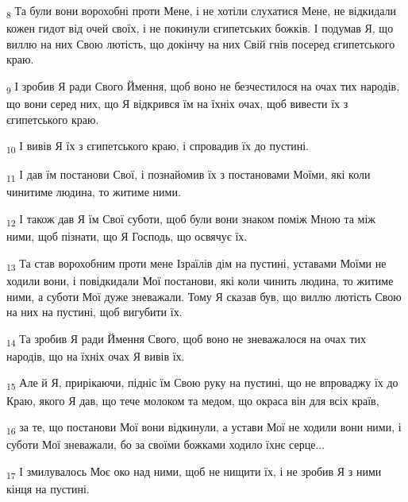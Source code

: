 \begin{tcolorbox}
\textsubscript{8} Та були вони ворохобні проти Мене, і не хотіли слухатися Мене, не відкидали кожен гидот від очей своїх, і не покинули єгипетських божків. І подумав Я, що виллю на них Свою лютість, що докінчу на них Свій гнів посеред єгипетського краю.
\end{tcolorbox}
\begin{tcolorbox}
\textsubscript{9} І зробив Я ради Свого Ймення, щоб воно не безчестилося на очах тих народів, що вони серед них, що Я відкрився їм на їхніх очах, щоб вивести їх з єгипетського краю.
\end{tcolorbox}
\begin{tcolorbox}
\textsubscript{10} І вивів Я їх з єгипетського краю, і спровадив їх до пустині.
\end{tcolorbox}
\begin{tcolorbox}
\textsubscript{11} І дав їм постанови Свої, і познайомив їх з постановами Моїми, які коли чинитиме людина, то житиме ними.
\end{tcolorbox}
\begin{tcolorbox}
\textsubscript{12} І також дав Я їм Свої суботи, щоб були вони знаком поміж Мною та між ними, щоб пізнати, що Я Господь, що освячує їх.
\end{tcolorbox}
\begin{tcolorbox}
\textsubscript{13} Та став ворохобним проти мене Ізраїлів дім на пустині, уставами Моїми не ходили вони, і повідкидали Мої постанови, які коли чинить людина, то житиме ними, а суботи Мої дуже зневажали. Тому Я сказав був, що виллю лютість Свою на них на пустині, щоб вигубити їх.
\end{tcolorbox}
\begin{tcolorbox}
\textsubscript{14} Та зробив Я ради Ймення Свого, щоб воно не зневажалося на очах тих народів, що на їхніх очах Я вивів їх.
\end{tcolorbox}
\begin{tcolorbox}
\textsubscript{15} Але й Я, прирікаючи, підніс їм Свою руку на пустині, що не впроваджу їх до Краю, якого Я дав, що тече молоком та медом, що окраса він для всіх країв,
\end{tcolorbox}
\begin{tcolorbox}
\textsubscript{16} за те, що постанови Мої вони відкинули, а устави Мої не ходили вони ними, і суботи Мої зневажали, бо за своїми божками ходило їхнє серце...
\end{tcolorbox}
\begin{tcolorbox}
\textsubscript{17} І змилувалось Моє око над ними, щоб не нищити їх, і не зробив Я з ними кінця на пустині.
\end{tcolorbox}
